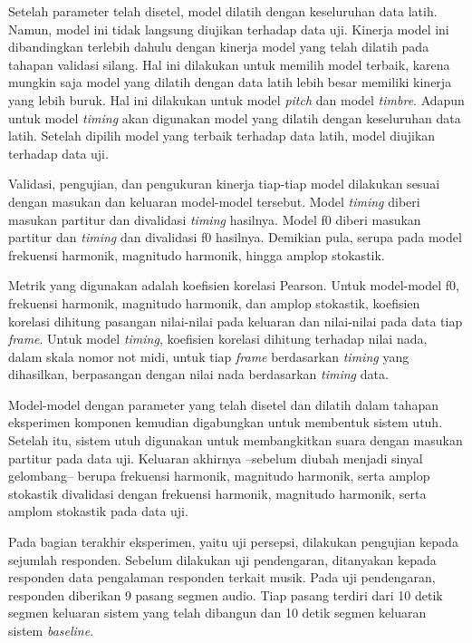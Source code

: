 Setelah parameter telah disetel, model dilatih dengan keseluruhan data latih. Namun, model ini tidak langsung diujikan terhadap data uji. Kinerja model ini dibandingkan terlebih dahulu dengan kinerja model yang telah dilatih pada tahapan validasi silang. Hal ini dilakukan untuk memilih model terbaik, karena mungkin saja model yang dilatih dengan data latih lebih besar memiliki kinerja yang lebih buruk. Hal ini dilakukan untuk model \textit{pitch} dan model \textit{timbre}. Adapun untuk model \textit{timing} akan digunakan model yang dilatih dengan keseluruhan data latih. Setelah dipilih model yang terbaik terhadap data latih, model diujikan terhadap data uji.

Validasi, pengujian, dan pengukuran kinerja tiap-tiap model dilakukan sesuai dengan masukan dan keluaran model-model tersebut. Model \textit{timing} diberi masukan partitur dan divalidasi \textit{timing} hasilnya. Model f0 diberi masukan partitur dan \textit{timing} dan divalidasi f0 hasilnya. Demikian pula, serupa pada model frekuensi harmonik, magnitudo harmonik, hingga amplop stokastik.

Metrik yang digunakan adalah koefisien korelasi Pearson. Untuk model-model f0, frekuensi harmonik, magnitudo harmonik, dan amplop stokastik, koefisien korelasi dihitung pasangan nilai-nilai pada keluaran dan nilai-nilai pada data tiap \textit{frame}. Untuk model \textit{timing}, koefisien korelasi dihitung terhadap nilai nada, dalam skala nomor not midi, untuk tiap \textit{frame} berdasarkan \textit{timing} yang dihasilkan, berpasangan dengan nilai nada berdasarkan \textit{timing} data.

Model-model dengan parameter yang telah disetel dan dilatih dalam tahapan eksperimen komponen kemudian digabungkan untuk membentuk sistem utuh. Setelah itu, sistem utuh digunakan untuk membangkitkan suara dengan masukan partitur pada data uji. Keluaran akhirnya --sebelum diubah menjadi sinyal gelombang-- berupa frekuensi harmonik, magnitudo harmonik, serta amplop stokastik divalidasi dengan frekuensi harmonik, magnitudo harmonik, serta amplom stokastik pada data uji.

Pada bagian terakhir eksperimen, yaitu uji persepsi, dilakukan pengujian kepada sejumlah responden. Sebelum dilakukan uji pendengaran, ditanyakan kepada responden data pengalaman responden terkait musik. Pada uji pendengaran, responden diberikan 9 pasang segmen audio. Tiap pasang terdiri dari 10 detik segmen keluaran sistem yang telah dibangun dan 10 detik segmen keluaran sistem \textit{baseline}.

